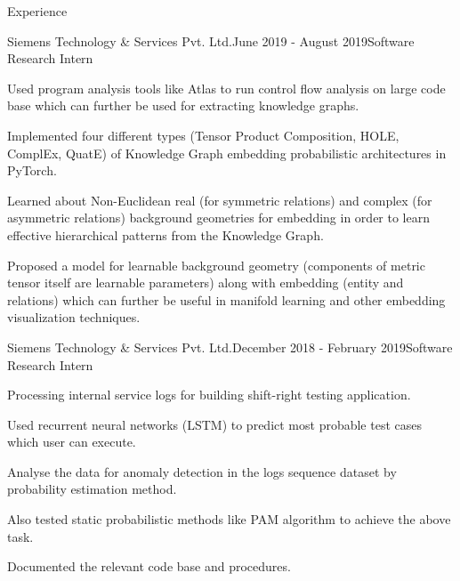 \documentclass{resume} %
\begin{document}

\begin{rSection}{Experience}

\begin{rSubsection}{Siemens Technology \& Services Pvt. Ltd.}{June 2019 - August 2019}{Software Research Intern}{}
\item Used program analysis tools like Atlas to run control flow analysis on large code base which can further be used for extracting knowledge graphs.
\item Implemented four different types (Tensor Product Composition, HOLE, ComplEx, QuatE) of Knowledge Graph embedding probabilistic architectures in PyTorch.
\item Learned about Non-Euclidean real (for symmetric relations) and complex (for asymmetric relations) background geometries for embedding in order to learn effective hierarchical patterns from the Knowledge Graph.
\item Proposed a model for learnable background geometry (components of metric tensor itself are learnable parameters) along with embedding (entity and relations) which can further be useful in manifold learning and other embedding visualization techniques. 
\end{rSubsection}

\newpage

\begin{rSubsection}{Siemens Technology \& Services Pvt. Ltd.}{December 2018 - February 2019}{Software Research Intern}{}
\item Processing internal service logs for building shift-right testing application.
\item Used recurrent neural networks (LSTM) to predict most probable test cases which user can execute.
\item Analyse the data for anomaly detection in the logs sequence dataset by probability estimation method.
\item Also tested static probabilistic methods like PAM algorithm to achieve the above task. 
\item Documented the relevant code base and procedures.
\end{rSubsection}


\end{rSection}
\end{document}
